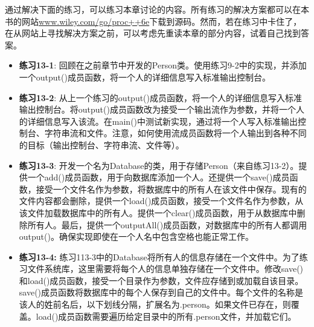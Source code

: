 通过解决下面的练习，可以练习本章讨论的内容。所有练习的解决方案都可以在本书的网站\url{www.wiley.com/go/proc++6e}下载到源码。然而，若在练习中卡住了，在从网站上寻找解决方案之前，可以考虑先重读本章的部分内容，试着自己找到答案。

\begin{itemize}
\item
\textbf{练习13-1}: 回顾在之前章节中开发的Person类。使用练习9-2中的实现，并添加一个output()成员函数，将一个人的详细信息写入标准输出控制台。

\item
\textbf{练习13-2}: 从上一个练习的output()成员函数，将一个人的详细信息写入标准输出控制台。将output()成员函数改为接受一个输出流作为参数，并将一个人的详细信息写入该流。在main()中测试新实现，通过将一个人写入标准输出控制台、字符串流和文件。注意，如何使用流成员函数将一个人输出到各种不同的目标（输出控制台、字符串流、文件等）。

\item
\textbf{练习13-3}: 开发一个名为Database的类，用于存储Person（来自练习13-2）。提供一个add()成员函数，用于向数据库添加一个人。还提供一个save()成员函数，接受一个文件名作为参数，将数据库中的所有人在该文件中保存。现有的文件内容都会删除，提供一个load()成员函数，接受一个文件名作为参数，从该文件加载数据库中的所有人。提供一个clear()成员函数，用于从数据库中删除所有人。最后，提供一个outputAll()成员函数，对数据库中的所有人都调用output()。确保实现即使在一个人名中包含空格也能正常工作。

\item
\textbf{练习13-4:} 练习113-3中的Database将所有人的信息存储在一个文件中。为了练习文件系统库，这里需要将每个人的信息单独存储在一个文件中。修改save()和load()成员函数，接受一个目录作为参数，文件应存储到或加载自该目录。save()成员函数将数据库中的每个人保存到自己的文件中。每个文件的名称是该人的姓前名后，以下划线分隔，扩展名为.person。如果文件已存在，则覆盖。load()成员函数需要遍历给定目录中的所有.person文件，并加载它们。
\end{itemize}

